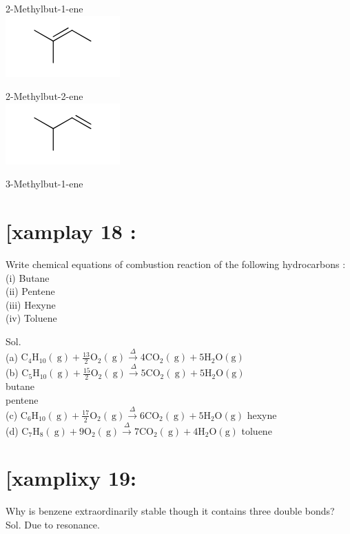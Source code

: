 \documentclass[10pt]{article}
\begin{document}
2-Methylbut-1-ene\\
\includegraphics{smile-9e1780dcbcb14306b466c4b3fba13533e7410337}

2-Methylbut-2-ene\\
\includegraphics{smile-f78788a71452f8c4de06da29370d7d857c5c038d}

3-Methylbut-1-ene

\section*{[xamplay 18 :}
Write chemical equations of combustion reaction of the following hydrocarbons :\\
(i) Butane\\
(ii) Pentene\\
(iii) Hexyne\\
(iv) Toluene

Sol.\\
(a) $\mathrm{C}_{4} \mathrm{H}_{10}(\mathrm{~g})+\frac{13}{2} \mathrm{O}_{2}(\mathrm{~g}) \xrightarrow{\Delta} 4 \mathrm{CO}_{2}(\mathrm{~g})+5 \mathrm{H}_{2} \mathrm{O}(\mathrm{g})$\\
(b) $\mathrm{C}_{5} \mathrm{H}_{10}(\mathrm{~g})+\frac{15}{2} \mathrm{O}_{2}(\mathrm{~g}) \xrightarrow{\Delta} 5 \mathrm{CO}_{2}(\mathrm{~g})+5 \mathrm{H}_{2} \mathrm{O}(\mathrm{g})$\\
butane\\
pentene\\
(c) $\mathrm{C}_{6} \mathrm{H}_{10}(\mathrm{~g})+\frac{17}{2} \mathrm{O}_{2}(\mathrm{~g}) \xrightarrow{\Delta} 6 \mathrm{CO}_{2}(\mathrm{~g})+5 \mathrm{H}_{2} \mathrm{O}(\mathrm{g})$ hexyne\\
(d) $\mathrm{C}_{7} \mathrm{H}_{8}(\mathrm{~g})+9 \mathrm{O}_{2}(\mathrm{~g}) \xrightarrow{\Delta} 7 \mathrm{CO}_{2}(\mathrm{~g})+4 \mathrm{H}_{2} \mathrm{O}(\mathrm{g})$ toluene

\section*{[xamplixy 19:}
Why is benzene extraordinarily stable though it contains three double bonds?\\
Sol. Due to resonance.
\end{document}
